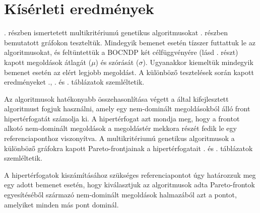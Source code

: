 \clearpage
\section{Kísérleti eredmények}


. részben ismertetett multikritériumú genetikus algoritmusokat . részben bemutatott gráfokon teszteltük.
Mindegyik bemenet esetén tízszer futtattuk le az algoritmusokat, és feltüntettük a BOCNDP két célfüggvényére (lásd . részt) kapott megoldások átlagát ($\mu$) és szórását ($\sigma$).
Ugyanakkor kiemeltük mindegyik bemenet esetén az elért legjobb megoldást.
A különböző tesztelések során kapott eredményeket ., . és . táblázatok szemléltetik.

Az algoritmusok hatékonyabb összehasonlítása végett a  által kifejlesztett algoritmust fogjuk használni, amely egy nem-dominált megoldásokból álló front hipertérfogatát számolja ki.
A hipertérfogat azt mondja meg, hogy a frontot alkotó nem-dominált megoldások a megoldástér mekkora részét fedik le egy referenciaponthoz viszonyítva.
A multikritériumú genetikus algoritmusok a különböző gráfokra kapott Pareto-frontjainak a hipertérfogatait . és . táblázatok szemléltetik.

A hipertérfogatok kiszámításához szükséges referenciapontot úgy határozzuk meg egy adott bemenet esetén,
hogy kiválasztjuk az algoritmusok adta Pareto-frontok egyesítéséből származó nem-dominált megoldások halmazából azt a pontot, amelyiket minden más pont dominál.


